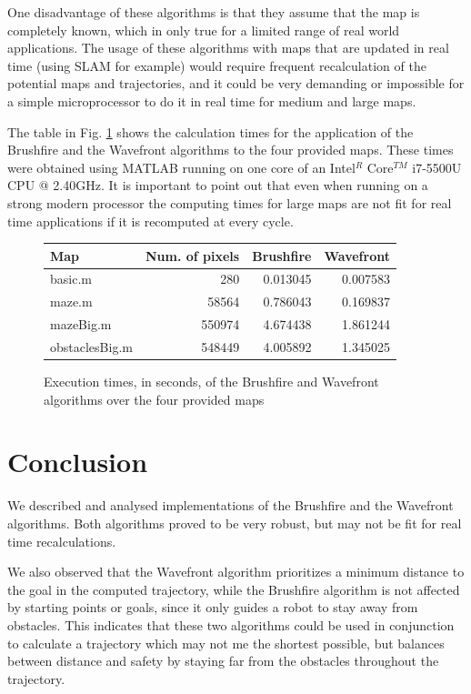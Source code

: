 \documentclass[journal]{IEEEtran}
\begin{document}
One disadvantage of these algorithms is that they assume that the map is completely known, which in only true for a limited range of real world applications. The usage of these algorithms with maps that are updated in real time (using SLAM for example) would require frequent recalculation of the potential maps and trajectories, and it could be very demanding or impossible for a simple microprocessor to do it in real time for medium and large maps.

The table in Fig. \ref{times} shows the calculation times for the application of the Brushfire and the Wavefront algorithms to the four provided maps. These times were obtained using MATLAB running on one core of an Intel$^R$ Core$^{TM}$ i7-5500U CPU @ 2.40GHz. It is important to point out that even when running on a strong modern processor the computing times for large maps are not fit for real time applications if it is recomputed at every cycle.


\begin{figure}[H]\label{times}
\centering
\begin{tabular}{l | r r r}
Map & Num. of pixels & Brushfire & Wavefront \\
\hline
basic.m & 280 & 0.013045 & 0.007583 \\
maze.m & 58564 & 0.786043 & 0.169837 \\
mazeBig.m & 550974 & 4.674438 & 1.861244 \\
obstaclesBig.m & 548449 & 4.005892 & 1.345025 \\
\end{tabular}
\caption{Execution times, in seconds, of the Brushfire and Wavefront algorithms over the four provided maps}
\end{figure}


\section{Conclusion}\label{conclusion}

We described and analysed implementations of the Brushfire and the Wavefront algorithms. Both algorithms proved to be very robust, but may not be fit for real time recalculations. 

We also observed that the Wavefront algorithm prioritizes a minimum distance to the goal in the computed trajectory, while the Brushfire algorithm is not affected by starting points or goals, since it only guides a robot to stay away from obstacles. This indicates that these two algorithms could be used in conjunction to calculate a trajectory which may not me the shortest possible, but balances between distance and safety by staying far from the obstacles throughout the trajectory.
\end{document}
